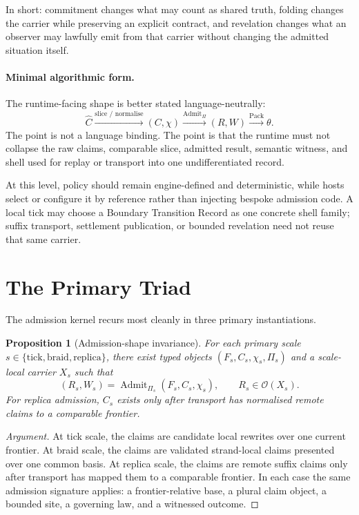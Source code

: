 \documentclass[11pt]{article}
\theoremstyle{definition}
\theoremstyle{plain}
\newtheorem{proposition}[definition]{Proposition}
\theoremstyle{remark}
\newenvironment{argument}{\begin{proof}[Argument]}{\end{proof}}
\begin{document}
In short: commitment changes what may count as shared truth, folding changes
the carrier while preserving an explicit contract, and revelation changes what
an observer may lawfully emit from that carrier without changing the admitted
situation itself.

\paragraph{Minimal algorithmic form.}
The runtime-facing shape is better stated language-neutrally:
\[
\widehat{C}
\xrightarrow{\text{slice / normalise}}
(C,\chi)
\xrightarrow{\operatorname{Admit}_{\Pi}}
(R,W)
\xrightarrow{\operatorname{Pack}}
\theta .
\]
The point is not a language binding. The point is that the runtime must not collapse the raw claims, comparable slice, admitted result, semantic witness, and shell used for replay or transport into one undifferentiated record.

At this level, policy should remain engine-defined and deterministic, while
hosts select or configure it by reference rather than injecting bespoke
admission code. A local tick may choose a Boundary Transition Record as one
concrete shell family; suffix transport, settlement publication, or bounded
revelation need not reuse that same carrier.

\section{The Primary Triad}

The admission kernel recurs most cleanly in three primary instantiations.

\begin{proposition}[Admission-shape invariance]
For each primary scale
\(s \in \{\mathrm{tick}, \mathrm{braid}, \mathrm{replica}\}\),
there exist typed objects
\((F_s, C_s, \chi_s, \Pi_s)\)
and a scale-local carrier \(X_s\) such that
\[
(R_s, W_s) = \operatorname{Admit}_{\Pi_s}(F_s, C_s, \chi_s),
\qquad
R_s \in \mathcal{O}(X_s).
\]
For replica admission, \(C_s\) exists only after transport has normalised remote
claims to a comparable frontier.
\end{proposition}

\begin{argument}
At tick scale, the claims are candidate local rewrites over one current
frontier. At braid scale, the claims are validated strand-local claims
presented over one common basis. At replica scale, the claims are remote suffix
claims only after transport has mapped them to a comparable frontier. In each
case the same admission signature applies: a frontier-relative base, a plural
claim object, a bounded site, a governing law, and a witnessed outcome.
\end{argument}
\end{document}
